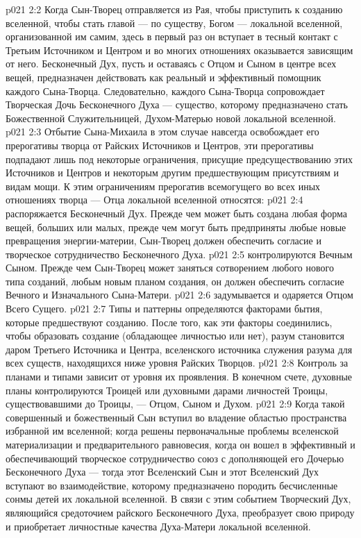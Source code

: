 \vs p021 2:2 \pc Когда Сын\hyp{}Творец отправляется из Рая, чтобы приступить к созданию вселенной, чтобы стать главой --- по существу, Богом --- локальной вселенной, организованной им самим, здесь в первый раз он вступает в тесный контакт с Третьим Источником и Центром и во многих отношениях оказывается зависящим от него. Бесконечный Дух, пусть и оставаясь с Отцом и Сыном в центре всех вещей, предназначен действовать как реальный и эффективный помощник каждого Сына\hyp{}Творца. Следовательно, каждого Сына\hyp{}Творца сопровождает Творческая Дочь Бесконечного Духа --- существо, которому предназначено стать Божественной Служительницей, Духом\hyp{}Матерью новой локальной вселенной.
\vs p021 2:3 Отбытие Сына\hyp{}Михаила в этом случае навсегда освобождает его прерогативы творца от Райских Источников и Центров, эти прерогативы подпадают лишь под некоторые ограничения, присущие предсуществованию этих Источников и Центров и некоторым другим предшествующим присутствиям и видам мощи. К этим ограничениям прерогатив всемогущего во всех иных отношениях творца --- Отца локальной вселенной относятся:
\vs p021 2:4 \bibnobreakspace {} распоряжается Бесконечный Дух. Прежде чем может быть создана любая форма вещей, больших или малых, прежде чем могут быть предприняты любые новые превращения энергии\hyp{}материи, Сын\hyp{}Творец должен обеспечить согласие и творческое сотрудничество Бесконечного Духа.
\vs p021 2:5 \bibnobreakspace {} контролируются Вечным Сыном. Прежде чем Сын\hyp{}Творец может заняться сотворением любого нового типа созданий, любым новым планом создания, он должен обеспечить согласие Вечного и Изначального Сына\hyp{}Матери.
\vs p021 2:6 \bibnobreakspace {} задумывается и одаряется Отцом Всего Сущего.
\vs p021 2:7 \pc Типы и паттерны  определяются факторами бытия, которые предшествуют созданию. После того, как эти факторы соединились, чтобы образовать создание (обладающее личностью или нет), разум становится даром Третьего Источника и Центра, вселенского источника служения разума для всех существ, находящихся ниже уровня Райских Творцов.
\vs p021 2:8 \pc Контроль за планами и типами  зависит от уровня их проявления. В конечном счете, духовные планы контролируются Троицей или духовными дарами личностей Троицы, существовавшими до Троицы, --- Отцом, Сыном и Духом.
\vs p021 2:9 \pc Когда такой совершенный и божественный Сын вступил во владение областью пространства избранной им вселенной; когда решены первоначальные проблемы вселенской материализации и предварительного равновесия, когда он вошел в эффективный и обеспечивающий творческое сотрудничество союз с дополняющей его Дочерью Бесконечного Духа --- тогда этот Вселенский Сын и этот Вселенский Дух вступают во взаимодействие, которому предназначено породить бесчисленные сонмы детей их локальной вселенной. В связи с этим событием Творческий Дух, являющийся средоточием райского Бесконечного Духа, преобразует свою природу и приобретает личностные качества Духа\hyp{}Матери локальной вселенной.
